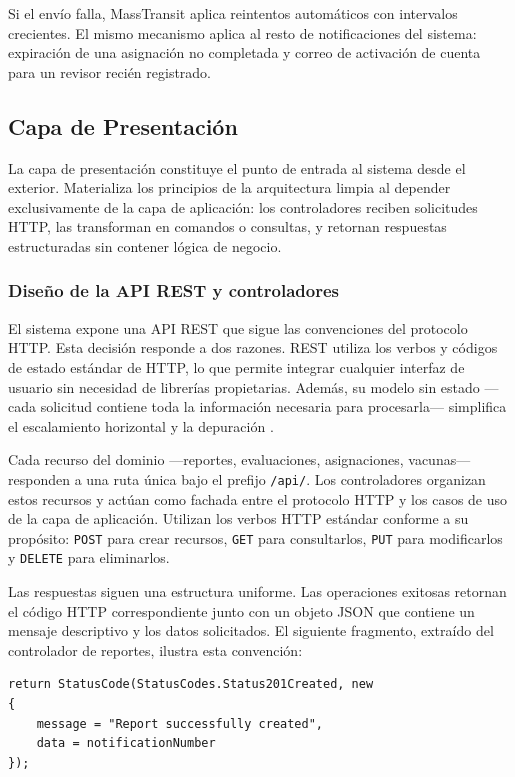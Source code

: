 Si el envío falla, MassTransit aplica reintentos automáticos con intervalos crecientes. El mismo mecanismo aplica al resto de notificaciones del sistema: expiración de una asignación no completada y correo de activación de cuenta para un revisor recién registrado.



\subsection{Capa de Presentación}

La capa de presentación constituye el punto de entrada al sistema desde el exterior. Materializa los principios de la arquitectura limpia al depender exclusivamente de la capa de aplicación: los controladores reciben solicitudes HTTP, las transforman en comandos o consultas, y retornan respuestas estructuradas sin contener lógica de negocio.

\subsubsection{Diseño de la API REST y controladores}

El sistema expone una API REST que sigue las convenciones del protocolo HTTP. 
Esta decisión responde a dos razones. REST utiliza los verbos y códigos de estado estándar de HTTP, lo que permite integrar cualquier interfaz de usuario sin necesidad de librerías propietarias. Además, su modelo sin estado —cada solicitud contiene toda la información necesaria para procesarla— simplifica el escalamiento horizontal y la depuración \cite{fielding2000}.

Cada recurso del dominio —reportes, evaluaciones, asignaciones, vacunas— responden a una ruta única bajo el prefijo \texttt{/api/}. 
Los controladores organizan estos recursos y actúan como fachada entre el protocolo HTTP y los casos de uso de la capa de aplicación.
Utilizan los verbos HTTP estándar conforme a su propósito: \texttt{POST} para crear recursos, \texttt{GET} para consultarlos, \texttt{PUT} para modificarlos y \texttt{DELETE} para eliminarlos. 

Las respuestas siguen una estructura uniforme. Las operaciones exitosas retornan el código HTTP correspondiente junto con un objeto JSON que contiene un mensaje descriptivo y los datos solicitados. El siguiente fragmento, extraído del controlador de reportes, ilustra esta convención:

\begin{lstlisting}[language={[Sharp]C}, caption={Respuesta estructurada en el controlador de reportes}, label={lst:apiresponse}]
return StatusCode(StatusCodes.Status201Created, new
{
    message = "Report successfully created",
    data = notificationNumber
});
\end{lstlisting}

